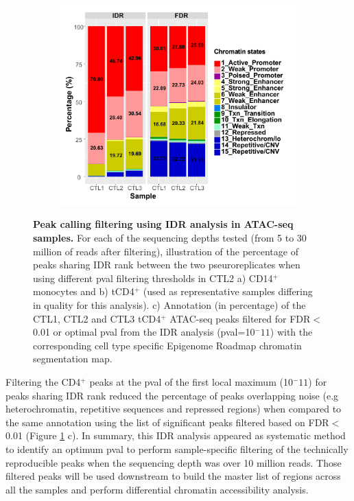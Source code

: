 \begin{figure}[htbp]
\begin{subfigure}{0.65\textwidth}
\includegraphics[width=\textwidth]{./Results1/pdfs/stacked_barplot_chromatin_states_percent_CD4_qval_vs_PVAL_IDR_filtered}
\caption{\textbf{}} %
\end{subfigure}%
\caption[Peak calling filtering using IDR analysis in ATAC-seq samples.]{\textbf{Peak calling filtering using IDR analysis in ATAC-seq samples.} For each of the sequencing depths tested (from 5 to 30 million of reads after filtering), illustration of the percentage of peaks sharing IDR rank between the two pseuroreplicates when using different pval filtering thresholds in CTL2 a) CD14$^+$ monocytes and b) tCD4$^+$ (used as representative samples differing in quality for this analysis). c) Annotation (in percentage) of the CTL1, CTL2 and CTL3 tCD4$^+$ ATAC-seq peaks filtered for FDR$<$0.01 or optimal pval from the IDR analysis (pval=10$^-11$) with the corresponding cell type specific Epigenome Roadmap chromatin segmentation map.}
\label{figure:Peak_calling_IDR_filtering_and_chrom_stated_ATAC}
\end{figure} 


Filtering the CD4$^+$ peaks at the pval of the first local maximum (10$^-11$) for peaks sharing IDR rank reduced the percentage of peaks overlapping noise (e.g heterochromatin, repetitive sequences and repressed regions) when compared to the same annotation using the list of significant peaks filtered based on FDR$<$0.01 (Figure \ref{figure:Peak_calling_IDR_filtering_and_chrom_stated_ATAC} c). In summary, this IDR analysis appeared as systematic method to identify an optimum pval to perform sample-specific filtering of the technically reproducible peaks when the sequencing depth was over 10 million reads. Those filtered peaks will be used downstream to build the master list of regions across all the samples and perform differential chromatin accessibility analysis. 

